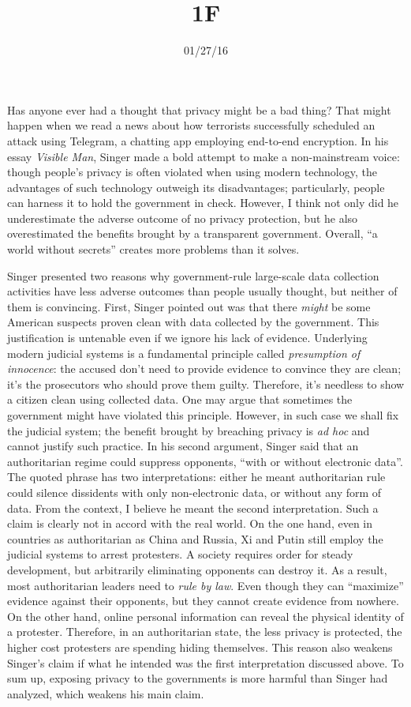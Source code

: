\documentclass{writing}
\title{1F}
\date{01/27/16}
\begin{document}
\maketitle

Has anyone ever had a thought that privacy might be a bad thing? That
might happen when we read a news about how terrorists successfully
scheduled an attack using Telegram, a chatting app employing end-to-end
encryption. In his essay \emph{Visible Man}, Singer made a bold attempt
to make a non-mainstream voice: though people's privacy is often
violated when using modern technology, the advantages of such technology
outweigh its disadvantages; particularly, people can harness it to hold
the government in check. However, I think not only did he underestimate
the adverse outcome of no privacy protection, but he also overestimated
the benefits brought by a transparent government. Overall, ``a world
without secrets'' creates more problems than it solves.

Singer presented two reasons why government-rule large-scale data
collection activities have less adverse outcomes than people usually
thought, but neither of them is convincing. First, Singer pointed out
was that there \emph{might} be some American suspects proven clean with
data collected by the government. This justification is untenable even
if we ignore his lack of evidence. Underlying modern judicial systems is
a fundamental principle called \emph{presumption of innocence}: the
accused don't need to provide evidence to convince they are clean; it's
the prosecutors who should prove them guilty. Therefore, it's needless
to show a citizen clean using collected data. One may argue that
sometimes the government might have violated this principle. However, in
such case we shall fix the judicial system; the benefit brought by
breaching privacy is \emph{ad hoc} and cannot justify such practice. In
his second argument, Singer said that an authoritarian regime could
suppress opponents, ``with or without electronic data''. The quoted
phrase has two interpretations: either he meant authoritarian rule could
silence dissidents with only non-electronic data, or without any form of
data. From the context, I believe he meant the second interpretation.
Such a claim is clearly not in accord with the real world. On the one
hand, even in countries as authoritarian as China and Russia, Xi and
Putin still employ the judicial systems to arrest protesters. A society
requires order for steady development, but arbitrarily eliminating
opponents can destroy it. As a result, most authoritarian leaders need
to \emph{rule by law}. Even though they can ``maximize'' evidence
against their opponents, but they cannot create evidence from nowhere.
On the other hand, online personal information can reveal the physical
identity of a protester. Therefore, in an authoritarian state, the less
privacy is protected, the higher cost protesters are spending hiding
themselves. This reason also weakens Singer's claim if what he intended
was the first interpretation discussed above. To sum up, exposing
privacy to the governments is more harmful than Singer had analyzed,
which weakens his main claim.
\end{document}
